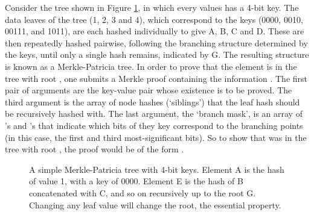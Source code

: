 Consider the tree shown in Figure \ref{fig:Merkleexample}, in which every values has a 4-bit key. The data leaves of the tree (1, 2, 3 and 4), which correspond to the keys (0000, 0010, 00111, and 1011), are each hashed individually to give A, B, C and D. These are then repeatedly hashed pairwise, following the branching structure determined by the keys, until only a single hash remains, indicated by G. The resulting structure is known as a Merkle-Patricia tree. In order to prove that the element  is in the tree with root , one submits a Merkle proof containing the information . The first pair of arguments are the key-value pair whose existence is to be proved. The third argument is the array of node hashes (`siblings') that the leaf hash should be recursively hashed with. The last argument, the `branch mask', is an array of 's and 's that indicate which bits of they key correspond to the branching points (in this case, the first and third most-significant bits). So to show that  was in the tree with root , the proof would be of the form .

\begin{figure}
\centering
 \caption{A simple Merkle-Patricia tree with 4-bit keys. Element A is the hash of value 1, with a key of 0000. Element E is the hash of B concatenated with C, and so on recursively up to the root G. Changing any leaf value will change the root, the essential property.}
 \label{fig:Merkleexample}
\end{figure}


